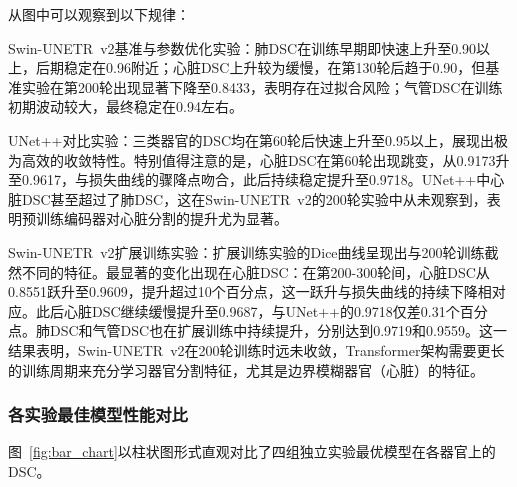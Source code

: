 \documentclass[12pt, a4paper]{article}
\begin{document}
从图中可以观察到以下规律：

Swin-UNETR~v2基准与参数优化实验：肺DSC在训练早期即快速上升至0.90以上，后期稳定在0.96附近；心脏DSC上升较为缓慢，在第130轮后趋于0.90，但基准实验在第200轮出现显著下降至0.8433，表明存在过拟合风险；气管DSC在训练初期波动较大，最终稳定在0.94左右。

UNet++对比实验：三类器官的DSC均在第60轮后快速上升至0.95以上，展现出极为高效的收敛特性。特别值得注意的是，心脏DSC在第60轮出现跳变，从0.9173升至0.9617，与损失曲线的骤降点吻合，此后持续稳定提升至0.9718。UNet++中心脏DSC甚至超过了肺DSC，这在Swin-UNETR~v2的200轮实验中从未观察到，表明预训练编码器对心脏分割的提升尤为显著。

Swin-UNETR~v2扩展训练实验：扩展训练实验的Dice曲线呈现出与200轮训练截然不同的特征。最显著的变化出现在心脏DSC：在第200-300轮间，心脏DSC从0.8551跃升至0.9609，提升超过10个百分点，这一跃升与损失曲线的持续下降相对应。此后心脏DSC继续缓慢提升至0.9687，与UNet++的0.9718仅差0.31个百分点。肺DSC和气管DSC也在扩展训练中持续提升，分别达到0.9719和0.9559。这一结果表明，Swin-UNETR~v2在200轮训练时远未收敛，Transformer架构需要更长的训练周期来充分学习器官分割特征，尤其是边界模糊器官（心脏）的特征。

\subsubsection{各实验最佳模型性能对比}

图~\ref{fig:bar_chart}以柱状图形式直观对比了四组独立实验最优模型在各器官上的DSC。
\end{document}
